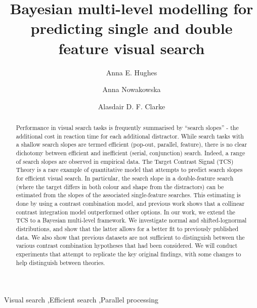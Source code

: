 \documentclass[preprint,12pt,authoryear]{elsarticle}
\begin{document}
\begin{frontmatter}

\title{Bayesian multi-level modelling for predicting single and double feature visual search}

\author[inst1]{Anna E. Hughes}
\author[2]{Anna Nowakowska}
\author[1]{Alasdair D. F. Clarke}

\address[inst1]{Department of Psychology,%
            University of Essex, 
            Colchester,
            CO4 3SQ,
            UK}

\address[2]{School of Psychology,%
            University of Aberdeen, 
            Aberdeen,
            AB24 3FX,            
            UK}

\begin{abstract}
Performance in visual search tasks is frequently summarised by ``search slopes'' - the additional cost in reaction time for each additional distractor. While search tasks with a shallow search slopes are termed efficient (pop-out, parallel, feature), there is no clear dichotomy between efficient and inefficient (serial, conjunction) search. Indeed, a range of search slopes are observed in empirical data. The Target Contrast Signal (TCS) Theory is a rare example of quantitative model that attempts to predict search slopes for efficient visual search. In particular, the search slope in a double-feature search (where the target differs in both colour and shape from the distractors) can be estimated from the slopes of the associated single-feature searches. This estimating is done by using a contrast combination model, and previous work shows that a collinear contrast integration model outperformed other options. In our work, we extend the TCS to a Bayesian multi-level framework. We investigate normal and shifted-lognormal distributions, and show that the latter allows for a better fit to previously published data. We also show that previous datasets are not sufficient to distinguish between the various contrast combination hypotheses that had been considered. We will conduct experiments that attempt to replicate the key original findings, with some changes to help distinguish between theories. 
\end{abstract}


\begin{keyword}
Visual search \sep  Efficient search \sep Parallel processing
\end{keyword}

\end{frontmatter}
\end{document}
